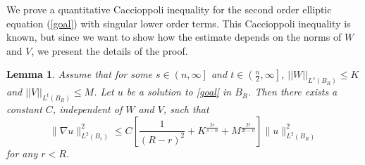 \documentclass[11pt]{amsart}
\theoremstyle{plain}
\newtheorem{lemma}{Lemma}
\numberwithin{equation}{section}
\begin{document}
We prove a quantitative  Caccioppoli inequality for the second order elliptic equation (\ref{goal}) with singular lower order terms.
This Caccioppoli inequality is known, but since we want to show how the estimate depends on the norms of $W$ and $V$, we present the details of the proof.

\begin{lemma}
Assume that for some $s \in {\left( {n, {\infty}} \right] }$ and $t \in {\left( { \frac n 2, {\infty}} \right] }$, ${\left\vert\left\vert {W}\right\vert\right\vert}_{L^s{\left( {B_{R}} \right) }} \le K$ and ${\left\vert\left\vert {V}\right\vert\right\vert}_{L^t{\left( {B_{R}} \right) }} \le M$.
Let $u$ be a solution to \eqref{goal} in $B_R$.
Then there exists a constant $C$, independent of $W$ and $V$, such that
\begin{equation}
\|\nabla u\|^2_{L^2(B_r)}\leq
C{\left[{\frac{1}{(R-r)^2}+K^{\frac{2s}{s-n}}+M^{\frac{2t}{2t-n}}}\right]}\|
u\|^2_{L^2(B_R)}
\end{equation}
for any $r<R$.
\label{CaccLem}
\end{lemma}
\end{document}

